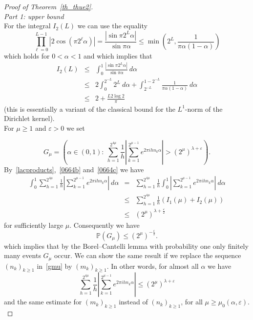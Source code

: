 \documentclass[12pt]{amsart}
\newcommand {\p} {\mathbb{P}}
\newcommand {\ve} {\varepsilon}
\begin{document}
\begin{proof}[Proof of Theorem~\ref{th_thue2}]~\\
\emph{Part 1: upper bound}\\

For the integral $I_2 (L)$ we can use the equality
\begin{equation} \label{BL3}
\prod_{\ell=0}^{L-1} \left| 2 \cos (\pi 2^\ell \alpha) \right| = \frac{\left| \sin \pi 2^{L} \alpha \right|}{\sin \pi \alpha} \leq \min \left(2^L, \frac{1}{\pi \alpha (1-\alpha)}\right)
\end{equation}
which holds for $0<\alpha<1$ and which implies that
\begin{eqnarray}
I_2 (L) & \leq & \int_0^1 \frac{\left| \sin \pi 2^{L} \alpha \right|}{\sin \pi \alpha} ~d\alpha \nonumber\\
& \leq & 2 \int_0^{2^{-L}} 2^L ~d\alpha + \int_{2^{-L}}^{1-2^{-L}} \frac{1}{\pi \alpha (1-\alpha)} ~d\alpha \nonumber\\
& \leq & 2 + \frac{L 2 \log 2}{\pi} \label{0664c}
\end{eqnarray}
(this is essentially a variant of the classical bound for the $L^{1}$-norm of the Dirichlet kernel).\\
For $\mu\geq 1$ and $\ve > 0$ we set

\begin{equation} \label{gmu}
G_\mu = \left( \alpha \in (0,1):~\sum_{h=1}^{2^{4\mu}} \frac{1}{h} \left| \sum_{k=1}^{2^{\mu-1}} e^{2 \pi i h n_k \alpha} \right| > (2^\mu)^{\lambda+\ve} \right).
\end{equation}
By~\eqref{lacproducts},~\eqref{0664b} and~\eqref{0664c} we have
\begin{eqnarray*}
\int_0^1 \sum_{h=1}^{2^{4\mu}} \frac{1}{h} \left| \sum_{k=1}^{2^{\mu-1}} e^{2 \pi i h n_k \alpha} \right| ~d\alpha & = & \sum_{h=1}^{2^{4\mu}} \frac{1}{h} \int_0^1 \left| \sum_{k=1}^{2^{\mu-1}}
e^{2 \pi i h n_k \alpha} \right| ~d\alpha \\
& \leq & \sum_{h=1}^{2^{4\mu}} \frac{1}{h} \left(I_1(\mu) + I_2(\mu)\right) \\
& \leq & (2^\mu)^{\lambda+\frac{\ve}{2}}
\end{eqnarray*}
for sufficiently large $\mu$. Consequently we have
$$
\p  (G_\mu) \leq (2^\mu)^{-\frac{\ve}{2}}.
$$
which implies that by the Borel--Cantelli lemma with probability one only finitely many events $G_\mu$ occur. We can show the same result if we replace the sequence $(n_k)_{k \geq 1}$ in~\eqref{gmu} by $(m_k)_{k \geq 1}$. In other words, for almost all $\alpha$ we have 
\begin{equation} \label{4095}
\sum_{h=1}^{2^{4\mu}} \frac{1}{h} \left| \sum_{k=1}^{2^{\mu-1}} e^{2 \pi i h n_k \alpha} \right| \leq (2^\mu)^{\lambda+\ve}
\end{equation}
and the same estimate for $(m_k)_{k \geq 1}$ instead of $(n_k)_{k \geq 1}$, for all $\mu \geq \mu_0 ( \alpha,\ve)$.\\


\end{proof}
\end{document}
